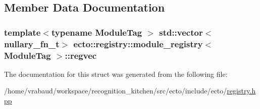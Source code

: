 \subsection{Member Data Documentation}
\hypertarget{structecto_1_1registry_1_1module__registry_a77ae3e886433428c82d5dbb8039d53f6}{}
\subsubsection[{regvec}]{\setlength{\rightskip}{0pt plus 5cm}template$<$typename Module\+Tag $>$ std\+::vector$<${\bf nullary\+\_\+fn\+\_\+t}$>$ {\bf ecto\+::registry\+::module\+\_\+registry}$<$ Module\+Tag $>$\+::regvec}\label{structecto_1_1registry_1_1module__registry_a77ae3e886433428c82d5dbb8039d53f6}


The documentation for this struct was generated from the following file\+:\begin{DoxyCompactItemize}
\item 
/home/vrabaud/workspace/recognition\+\_\+kitchen/src/ecto/include/ecto/\hyperlink{registry_8hpp}{registry.\+hpp}\end{DoxyCompactItemize}
